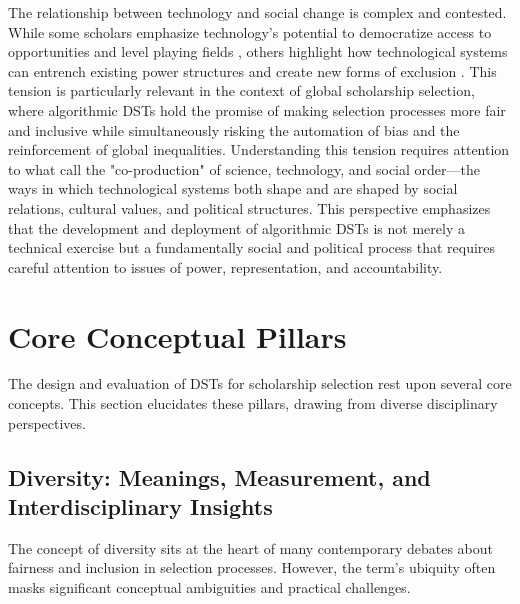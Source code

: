 The relationship between technology and social change is complex and contested. While some scholars emphasize technology's potential to democratize access to opportunities and level playing fields \cite{rheingold2002smart}, others highlight how technological systems can entrench existing power structures and create new forms of exclusion \cite{eubanks2018automating}. This tension is particularly relevant in the context of global scholarship selection, where algorithmic DSTs hold the promise of making selection processes more fair and inclusive while simultaneously risking the automation of bias and the reinforcement of global inequalities. Understanding this tension requires attention to what \textcite{jasanoff2004states} call the "co-production" of science, technology, and social order—the ways in which technological systems both shape and are shaped by social relations, cultural values, and political structures. This perspective emphasizes that the development and deployment of algorithmic DSTs is not merely a technical exercise but a fundamentally social and political process that requires careful attention to issues of power, representation, and accountability.

\section{Core Conceptual Pillars}\label{sec:context_conceptual_pillars}

The design and evaluation of DSTs for scholarship selection rest upon several core concepts. This section elucidates these pillars, drawing from diverse disciplinary perspectives.

\subsection{Diversity: Meanings, Measurement, and Interdisciplinary Insights}\label{ssec:context_diversity}
The concept of diversity sits at the heart of many contemporary debates about fairness and inclusion in selection processes. However, the term's ubiquity often masks significant conceptual ambiguities and practical challenges.

